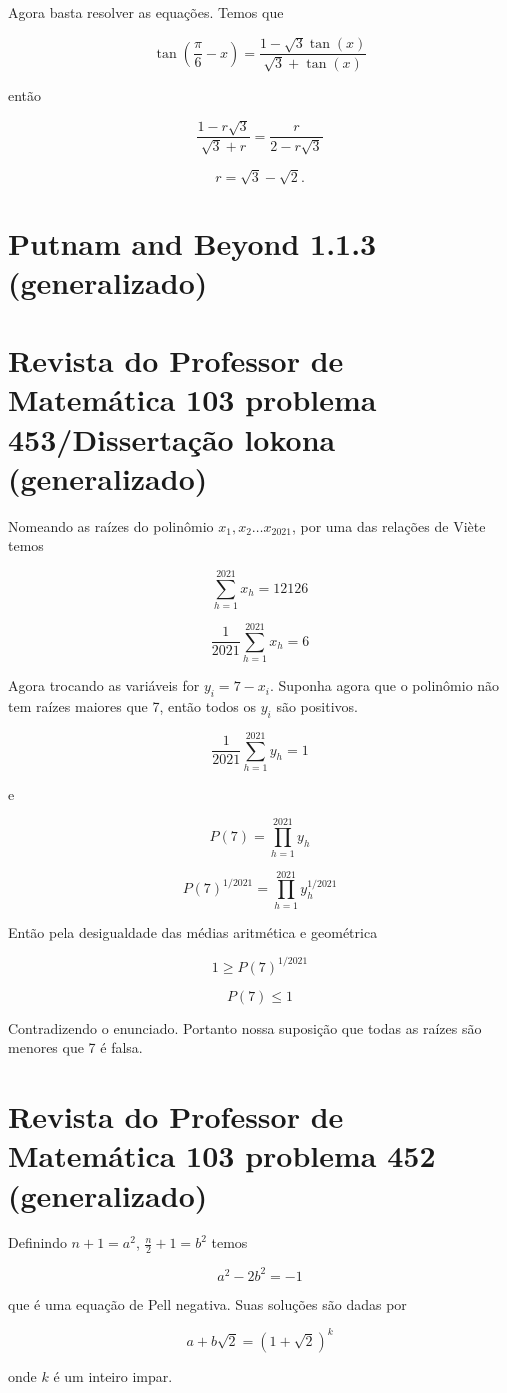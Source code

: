 Agora basta resolver as equações. Temos que

$$\tan\left(\frac\pi 6-x\right)=\frac{1-\sqrt{3}\tan(x)}{\sqrt{3}+\tan(x)}$$

então

$$\frac{1-r\sqrt{3}}{\sqrt{3}+r}=\frac{r}{2-r\sqrt{3}}$$

$$r=\sqrt{3}-\sqrt{2}.$$

\section{Putnam and Beyond 1.1.3 (generalizado)}

\section{Revista do Professor de Matemática 103 problema 453/Dissertação lokona (generalizado)}

Nomeando as raízes do polinômio $x_1,x_2\dots x_{2021}$, por uma das relações de Viète temos

$$\sum_{h=1}^{2021}x_h=12126$$

$$\frac 1{2021}\sum_{h=1}^{2021}x_h=6$$

Agora trocando as variáveis for $y_i=7-x_i$. Suponha agora que o polinômio não tem raízes maiores que 7, então todos os $y_i$ são positivos.

$$\frac 1{2021}\sum_{h=1}^{2021}y_h=1$$

e

$$P(7)=\prod_{h=1}^{2021}y_h$$

$$P(7)^{1/2021}=\prod_{h=1}^{2021}y_h^{1/2021}$$

Então pela desigualdade das médias aritmética e geométrica

$$1\geq P(7)^{1/2021}$$

$$P(7)\leq 1$$

Contradizendo o enunciado. Portanto nossa suposição que todas as raízes são menores que 7 é falsa.

\section{Revista do Professor de Matemática 103 problema 452 (generalizado)}

Definindo $n+1=a^2$, $\frac n2 +1=b^2$ temos

$$a^2-2b^2=-1$$

que é uma equação de Pell negativa. Suas soluções são dadas por

$$a+b\sqrt{2}=(1+\sqrt{2})^k$$

onde $k$ é um inteiro impar. 